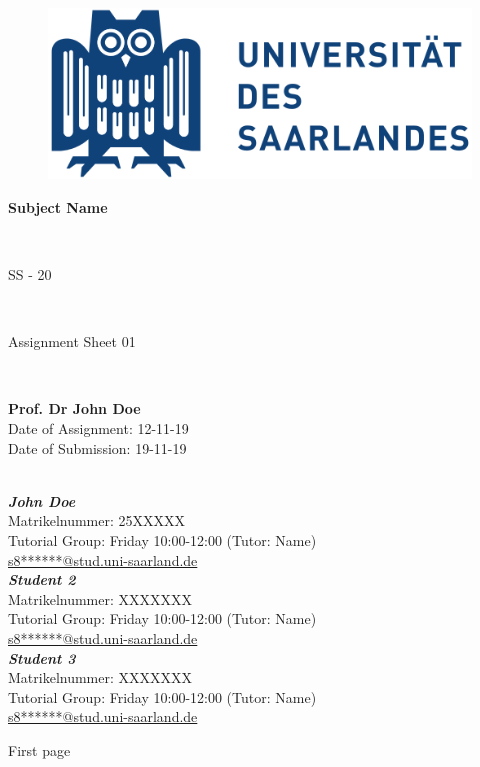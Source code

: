 \documentclass[a4paper,12pt]{article}
\begin{document}
\thispagestyle{empty}
\begin{figure}[t]
    \centering
    \includegraphics[scale=0.3]{UdS-Logo}
\end{figure}

\begin{center}
    \vspace{40pt}
    \begin{Huge}
        \textbf{Subject Name}
    \end{Huge}
    \\[10pt]
    \begin{Large}
        SS - 20 
    \end{Large}
    \\[40pt]
    \begin{LARGE}
        Assignment Sheet 01
    \end{LARGE}
    \\[40pt]
    \begin{large}
        \textbf{Prof. Dr John Doe} \\
        Date of Assignment: 12-11-19 \\
        Date of Submission: 19-11-19
    \end{large}
    \\[80pt]
    \textbf{\textit{John Doe}} \\
    Matrikelnummer: 25XXXXX \\
    Tutorial Group: Friday 10:00-12:00 (Tutor: Name)\\
    \href{mailto:s8j******@stud.uni-saarland.de}{s8******@stud.uni-saarland.de} \\[20pt]
    
    \textbf{\textit{Student 2}} \\
    Matrikelnummer: XXXXXXX \\
    Tutorial Group: Friday 10:00-12:00 (Tutor: Name)\\
    \href{mailto:s8j******@stud.uni-saarland.de}{s8******@stud.uni-saarland.de} \\[20pt]

    \textbf{\textit{Student 3}} \\
    Matrikelnummer: XXXXXXX \\
    Tutorial Group: Friday 10:00-12:00 (Tutor: Name)\\
    \href{mailto:s8j******@stud.uni-saarland.de}{s8******@stud.uni-saarland.de}
    \\
    
\end{center}
\newpage
\setcounter{page}{1}
First page
\end{document}
